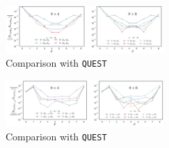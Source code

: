 \begin{figure}[H]
  \centering
  \includegraphics[width=6cm]{images/tmdFinalxyxy.png}
  \caption{Comparison with \texttt{QUEST}}
  \label{fig:blade_flow_pressure}
\end{figure}

\begin{figure}[H]
  \centering
  \includegraphics[width=6cm]{images/tmdFinalx2y2z2.png}
  \caption{Comparison with \texttt{QUEST}}
  \label{fig:blade_flow_pressure}
\end{figure}








